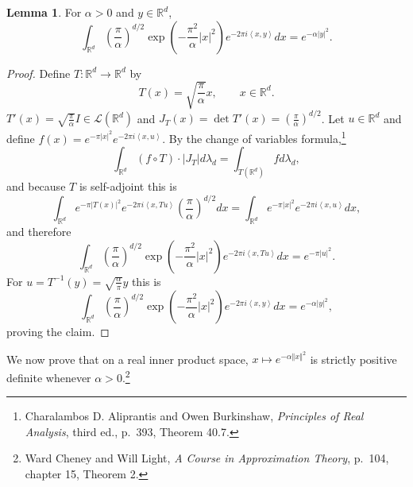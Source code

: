 \documentclass{article}
\newcommand{\inner}[2]{\left\langle #1, #2 \right\rangle}
\newcommand{\norm}[1]{\left\Vert #1 \right\Vert}
\theoremstyle{definition}
\newtheorem{lemma}[theorem]{Lemma}
\theoremstyle{definition}
\begin{document}
\begin{lemma}
For $\alpha>0$ and $y \in \mathbb{R}^d$,
\[
\int_{\mathbb{R}^d} \left(\frac{\pi}{\alpha}\right)^{d/2} \exp\left(-\frac{\pi^2}{\alpha} |x|^2\right)
e^{-2\pi i\inner{x}{y}} dx  = e^{-\alpha |y|^2}.
\]
\label{gaussian}
\end{lemma}
\begin{proof}
Define $T:\mathbb{R}^d \to \mathbb{R}^d$ by
\[
T(x) =  \sqrt{\frac{\pi}{\alpha}}x, \qquad x \in \mathbb{R}^d.
\]
$T'(x)= \sqrt{\frac{\pi}{\alpha}}I \in \mathscr{L}(\mathbb{R}^d)$ and $J_T(x)=\det T'(x) = \left(\frac{\pi}{\alpha}\right)^{d/2}$. 
Let $u \in \mathbb{R}^d$ and define  $f(x) = e^{-\pi |x|^2} e^{-2\pi i\inner{x}{u}}$.
By the change of variables formula,\footnote{Charalambos D. Aliprantis and Owen Burkinshaw, {\em Principles of Real Analysis}, third ed.,
p.~393, Theorem 40.7.}
\[
 \int_{\mathbb{R}^d} (f \circ T) \cdot  |J_T| d\lambda_d=
\int_{T(\mathbb{R}^d)} fd\lambda_d,
\]
and because $T$ is self-adjoint this is
\[
 \int_{\mathbb{R}^d} 
e^{-\pi |T(x)|^2} e^{-2\pi i\inner{x}{Tu}}
 \left(\frac{\pi}{\alpha}\right)^{d/2} dx=
\int_{\mathbb{R}^d} e^{-\pi |x|^2} e^{-2\pi i\inner{x}{u}} dx,
\]
and therefore
\[
\int_{\mathbb{R}^d}  \left(\frac{\pi}{\alpha}\right)^{d/2}  \exp\left(-\frac{\pi^2}{\alpha} |x|^2 \right)  e^{-2\pi i\inner{x}{Tu}} dx
=e^{-\pi|u|^2}.
\]
For $u = T^{-1}(y)=\sqrt{\frac{\alpha}{\pi}}y$ this is
\[
\int_{\mathbb{R}^d}  \left(\frac{\pi}{\alpha}\right)^{d/2}  \exp\left(-\frac{\pi^2}{\alpha} |x|^2 \right)  e^{-2\pi i\inner{x}{y}} dx
=e^{-\alpha |y|^2},
\]
proving the claim.
\end{proof}


We now prove that on a real inner product space, $x \mapsto e^{-\alpha \norm{x}^2}$ is strictly positive definite whenever
$\alpha>0$.\footnote{Ward Cheney and Will Light, {\em A Course
in Approximation Theory}, p.~104, chapter 15, Theorem 2.}
\end{document}

